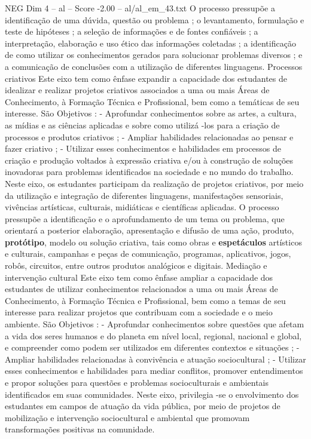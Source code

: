 \begin{textsample}{NEG Dim 4 – al – Score -2.00 – al/al\_em\_43.txt}
O processo pressupõe a identificação de uma dúvida, questão ou problema ; o levantamento, formulação e teste de hipóteses ; a seleção de informações e de fontes confiáveis ; a interpretação, elaboração e uso ético das informações coletadas ; a identificação de como utilizar os conhecimentos gerados para solucionar problemas diversos ; e a comunicação de conclusões com a utilização de diferentes linguagens.
Processos criativos Este eixo tem como ênfase expandir a capacidade dos estudantes de idealizar e realizar projetos criativos associados a uma ou mais Áreas de Conhecimento, à Formação Técnica e Profissional, bem como a temáticas de seu interesse.
São Objetivos : - Aprofundar conhecimentos sobre as artes, a cultura, as mídias e as ciências aplicadas e sobre como utilizá -los para a criação de processos e produtos criativos ; - Ampliar habilidades relacionadas ao pensar e fazer criativo ; - Utilizar esses conhecimentos e habilidades em processos de criação e produção voltados à expressão criativa e/ou à construção de soluções inovadoras para problemas identificados na sociedade e no mundo do trabalho.
Neste eixo, os estudantes participam da realização de projetos criativos, por meio da utilização e integração de diferentes linguagens, manifestações sensoriais, vivências artísticas, culturais, midiáticas e científicas aplicadas.
O processo pressupõe a identificação e o aprofundamento de um tema ou problema, que orientará a posterior elaboração, apresentação e difusão de uma ação, produto, \textbf{protótipo}, modelo ou solução criativa, tais como obras e \textbf{espetáculos} artísticos e culturais, campanhas e peças de comunicação, programas, aplicativos, jogos, robôs, circuitos, entre outros produtos analógicos e digitais.
Mediação e intervenção cultural Este eixo tem como ênfase ampliar a capacidade dos estudantes de utilizar conhecimentos relacionados a uma ou mais Áreas de Conhecimento, à Formação Técnica e Profissional, bem como a temas de seu interesse para realizar projetos que contribuam com a sociedade e o meio ambiente.
São Objetivos : - Aprofundar conhecimentos sobre questões que afetam a vida dos seres humanos e do planeta em nível local, regional, nacional e global, e compreender como podem ser utilizados em diferentes contextos e situações ; - Ampliar habilidades relacionadas à convivência e atuação sociocultural ; - Utilizar esses conhecimentos e habilidades para mediar conflitos, promover entendimentos e propor soluções para questões e problemas socioculturais e ambientais identificados em suas comunidades.
Neste eixo, privilegia -se o envolvimento dos estudantes em campos de atuação da vida pública, por meio de projetos de mobilização e intervenção sociocultural e ambiental que promovam transformações positivas na comunidade.

\end{textsample}
